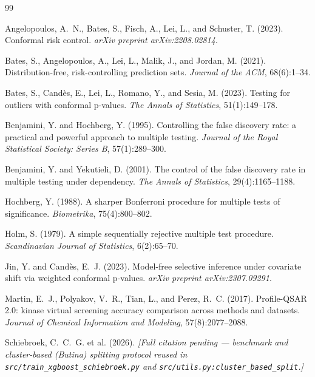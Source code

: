 \documentclass[11pt]{article}
\begin{document}

\begin{thebibliography}{99}

Angelopoulos, A.~N., Bates, S., Fisch, A., Lei, L., and Schuster, T. (2023).
Conformal risk control. \emph{arXiv preprint arXiv:2208.02814}.

Bates, S., Angelopoulos, A., Lei, L., Malik, J., and Jordan, M. (2021).
Distribution-free, risk-controlling prediction sets.
\emph{Journal of the ACM}, 68(6):1--34.

Bates, S., Cand\`es, E., Lei, L., Romano, Y., and Sesia, M. (2023).
Testing for outliers with conformal p-values.
\emph{The Annals of Statistics}, 51(1):149--178.

Benjamini, Y. and Hochberg, Y. (1995).
Controlling the false discovery rate: a practical and powerful approach to
multiple testing. \emph{Journal of the Royal Statistical Society: Series B},
57(1):289--300.

Benjamini, Y. and Yekutieli, D. (2001).
The control of the false discovery rate in multiple testing under
dependency. \emph{The Annals of Statistics}, 29(4):1165--1188.

Hochberg, Y. (1988).
A sharper Bonferroni procedure for multiple tests of significance.
\emph{Biometrika}, 75(4):800--802.

Holm, S. (1979).
A simple sequentially rejective multiple test procedure.
\emph{Scandinavian Journal of Statistics}, 6(2):65--70.

Jin, Y. and Cand\`es, E.~J. (2023).
Model-free selective inference under covariate shift via weighted conformal
p-values. \emph{arXiv preprint arXiv:2307.09291}.

Martin, E.~J., Polyakov, V.~R., Tian, L., and Perez, R.~C. (2017).
Profile-QSAR 2.0: kinase virtual screening accuracy comparison across
methods and datasets. \emph{Journal of Chemical Information and Modeling},
57(8):2077--2088.

Schiebroek, C.~C.~G. et al. (2026).
\emph{[Full citation pending --- benchmark and cluster-based (Butina)
splitting protocol reused in \texttt{src/train\_xgboost\_schiebroek.py} and
\texttt{src/utils.py:cluster\_based\_split}.]}


\end{thebibliography}
\end{document}
